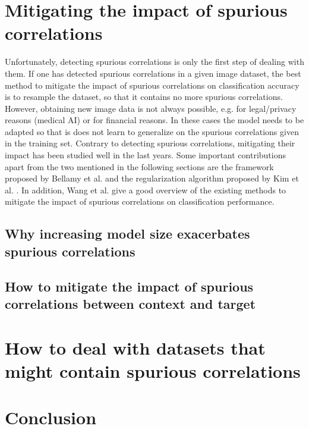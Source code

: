 \documentclass{article}
\begin{document}
\section{Mitigating the impact of spurious correlations}
Unfortunately, detecting spurious correlations is only the first step of dealing with them. If one has detected spurious correlations in a given image dataset, the best method to mitigate the impact of spurious correlations on classification accuracy is to resample the dataset, so that it contains no more spurious correlations. However, obtaining new image data is not always possible, e.g. for legal/privacy reasons (medical AI) or for financial reasons. In these cases the model needs to be adapted so that is does not learn to generalize on the spurious correlations given in the training set. Contrary to detecting spurious correlations, mitigating their impact has been studied well in the last years. Some important contributions apart from the two mentioned in the following sections are the framework proposed by Bellamy et al. \cite{bellamy2018ai} and the regularization algorithm proposed by Kim et al. \cite{Kim_2019_CVPR}. In addition, Wang et al. \cite{Wang_2020_CVPR} give a good overview of the existing methods to mitigate the impact of spurious correlations on classification performance.
\subsection{Why increasing model size exacerbates spurious correlations}

\subsection{How to mitigate the impact of spurious correlations between context and target}

\section{How to deal with datasets that might contain spurious correlations}

\section{Conclusion}

\printbibliography
\end{document}
